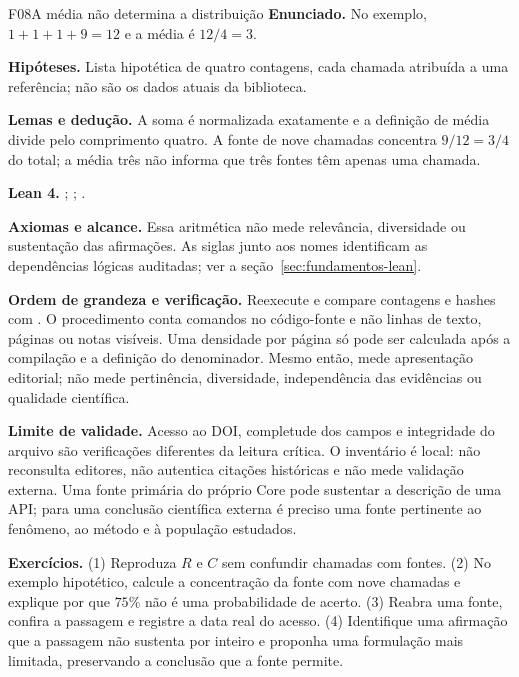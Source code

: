 \begin{formalizacao}{F08}{A média não determina a distribuição}
\textbf{Enunciado.} No exemplo, $1+1+1+9=12$ e a média é $12/4=3$.

\textbf{Hipóteses.} Lista hipotética de quatro contagens, cada chamada atribuída a uma referência; não são os dados atuais da biblioteca.

\textbf{Lemas e dedução.} A soma é normalizada exatamente e a definição de média divide pelo comprimento quatro. A fonte de nove chamadas concentra $9/12=3/4$ do total; a média três não informa que três fontes têm apenas uma chamada.

\textbf{Lean 4.} ; ; .

\textbf{Axiomas e alcance.} Essa aritmética não mede relevância, diversidade ou sustentação das afirmações. As siglas junto aos nomes identificam as dependências lógicas auditadas; ver a seção~\ref{sec:fundamentos-lean}.
\end{formalizacao}

\begin{resultado}
\textbf{Ordem de grandeza e verificação.} Reexecute 
e compare contagens e hashes com . O procedimento
conta comandos no código-fonte e não linhas de texto, páginas ou notas visíveis.
Uma densidade por página só pode ser calculada após a compilação e a definição
do denominador. Mesmo então, mede apresentação editorial; não mede pertinência,
diversidade, independência das evidências ou qualidade científica.
\end{resultado}
\begin{aviso}
\textbf{Limite de validade.} Acesso ao DOI, completude dos campos e integridade
do arquivo são verificações diferentes da leitura crítica. O inventário é local:
não reconsulta editores, não autentica citações históricas e não mede validação
externa. Uma fonte primária do próprio Core pode sustentar a descrição de uma
API; para uma conclusão científica externa é preciso uma fonte pertinente ao
fenômeno, ao método e à população estudados.
\end{aviso}
\begin{resultado}
\textbf{Exercícios.} (1) Reproduza $R$ e $C$ sem confundir chamadas com fontes.
(2) No exemplo hipotético, calcule a concentração da fonte com nove chamadas
e explique por que $75\%$ não é uma probabilidade de acerto.
(3) Reabra uma fonte, confira a passagem e registre a data real do acesso.
(4) Identifique uma afirmação que a passagem não sustenta por inteiro e proponha
uma formulação mais limitada, preservando a conclusão que a fonte permite.
\end{resultado}

